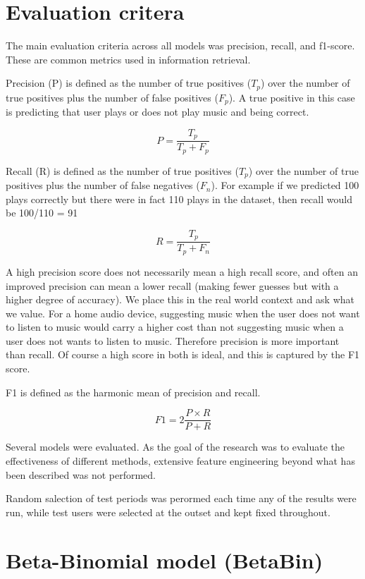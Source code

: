 \section{Evaluation critera}

The main evaluation criteria across all models was precision, recall, and f1-score. These are common metrics used in information retrieval. 

Precision (P) is defined as the number of true positives  ($T_p$) over the number of true positives plus the number of false positives ($F_p$). A true positive in this case is predicting that user plays or does not play music and being correct.

$$P = \frac{T_p}{T_p+F_p}$$

Recall (R) is defined as the number of true positives ($T_p$) over the number of true positives plus the number of false negatives ($F_n$). For example if we predicted 100 plays correctly but there were in fact 110 plays in the dataset, then recall would be 100/110 = 91%

$$R = \frac{T_p}{T_p + F_n}$$

A high precision score does not necessarily mean a high recall score, and often an improved precision can mean a lower recall (making fewer guesses but with a higher degree of accuracy). We place this in the real world context and ask what we value. For a home audio device, suggesting music when the user does not want to listen to music would carry a higher cost than not suggesting music when a user does not wants to listen to music. Therefore precision is more important than recall. Of course a high score in both is ideal, and this is captured by the F1 score.

F1 is defined as the harmonic mean of precision and recall.

$$F1 = 2\frac{P \times R}{P+R}$$

Several models were evaluated. As the goal of the research was to evaluate the effectiveness of different methods, extensive feature engineering beyond what has been described was not performed. 

Random salection of test periods was perormed each time any of the results were run, while test users were selected at the outset and kept fixed throughout.
 
\section{Beta-Binomial model (BetaBin)}

